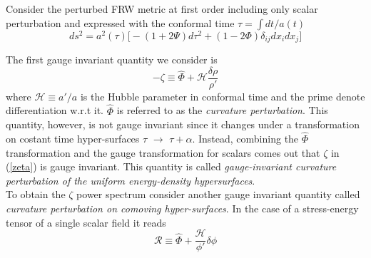 \documentclass[11pt,a4paper,twoside]{book}
\begin{document}
Consider the perturbed FRW metric at first order including only scalar perturbation and expressed with the conformal time $ \tau=\int dt/a(t) $
\begin{equation}
\label{metricPerturbed}
ds^{2}=a^{2}(\tau) \big [-(1+2\Psi)d\tau^{2} + (1-2\Phi)\delta_{ij}dx_{i}dx_{j} \big]
\end{equation}

The first gauge invariant quantity we consider is
\begin{equation}
	\label{zeta}
	-\zeta \equiv \hat{\Phi} + \mathcal{H}\frac{\delta \rho}{\rho'}
\end{equation}
where $\mathcal{H} \equiv a'/a$ is the Hubble parameter in conformal time and the prime denote differentiation w.r.t it. $\hat{\Phi}$ is referred to as the \textit{curvature perturbation}. This quantity, however, is not gauge invariant since it changes under a transformation on costant time hyper-surfaces $\tau$ $\rightarrow$ $ \tau + \alpha $. Instead, combining the $\hat{\Phi}$ transformation and the gauge transformation for scalars comes out that $\zeta$ in (\ref{zeta}) is gauge invariant. This quantity is called \textit{gauge-invariant curvature perturbation of the uniform energy-density hypersurfaces}.\\
To obtain the $\zeta$ power spectrum consider another gauge invariant quantity called \textit{curvature perturbation on comoving hyper-surfaces}. In the case of a stress-energy tensor of a single scalar field it reads
\begin{equation}
	\label{R}
	\mathcal{R} \equiv \hat{\Phi} + \frac{\mathcal{H}}{\phi'}\delta \phi
\end{equation}
\end{document}
